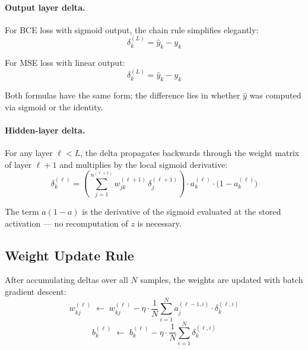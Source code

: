\documentclass[12pt,a4paper]{article}
\begin{document}
\paragraph{Output layer delta.}
For BCE loss with sigmoid output, the chain rule simplifies elegantly:
\begin{equation}
    \delta_k^{(L)} = \hat{y}_k - y_k
    \label{eq:delta_out_bce}
\end{equation}

For MSE loss with linear output:
\begin{equation}
    \delta_k^{(L)} = \hat{y}_k - y_k
    \label{eq:delta_out_mse}
\end{equation}

Both formulas have the same form; the difference lies in whether $\hat{y}$ was computed
via sigmoid or the identity.

\paragraph{Hidden-layer delta.}
For any layer $\ell < L$, the delta propagates backwards through the weight matrix of
layer $\ell{+}1$ and multiplies by the local sigmoid derivative:
\begin{equation}
    \delta_k^{(\ell)}
    = \left(\sum_{j=1}^{n^{(\ell+1)}} w_{jk}^{(\ell+1)}\, \delta_j^{(\ell+1)}\right)
      \cdot a_k^{(\ell)} \cdot \bigl(1 - a_k^{(\ell)}\bigr)
    \label{eq:delta_hidden}
\end{equation}

The term $a(1-a)$ is the derivative of the sigmoid evaluated at the stored activation ---
no recomputation of $z$ is necessary.

\subsection{Weight Update Rule}

After accumulating deltas over all $N$ samples, the weights are updated with
batch gradient descent:
\begin{equation}
    w_{kj}^{(\ell)} \;\leftarrow\; w_{kj}^{(\ell)}
        - \eta \cdot \frac{1}{N} \sum_{i=1}^{N} a_j^{(\ell-1,i)} \cdot \delta_k^{(\ell,i)}
    \label{eq:update_w}
\end{equation}
\begin{equation}
    b_k^{(\ell)} \;\leftarrow\; b_k^{(\ell)}
        - \eta \cdot \frac{1}{N} \sum_{i=1}^{N} \delta_k^{(\ell,i)}
    \label{eq:update_b}
\end{equation}
\end{document}
